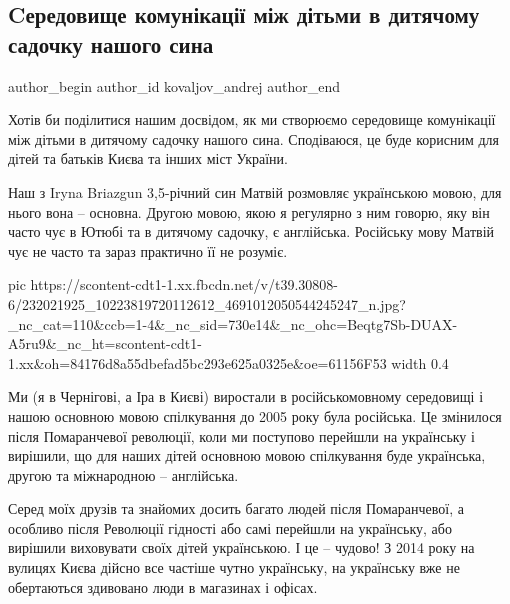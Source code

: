  
 
 
 
 
 
\subsection{Cередовище комунікації між дітьми в дитячому садочку нашого сина}
\label{sec:06_08_2021.fb.kovaljov_andrej.1.detsad_mova}
 
\ifcmt
 author_begin
   author_id kovaljov_andrej
 author_end
\fi

Хотів би поділитися нашим досвідом, як ми створюємо середовище комунікації між
дітьми в дитячому садочку нашого сина. Сподіваюся, це буде корисним для дітей
та батьків Києва та інших міст України.

Наш з Iryna Briazgun 3,5-річний син Матвій розмовляє українською мовою, для
нього вона – основна. Другою мовою, якою я регулярно з ним говорю, яку він
часто чує в Ютюбі та в дитячому садочку, є англійська. Російську мову Матвій
чує не часто та зараз практично її не розуміє.

\ifcmt
  pic https://scontent-cdt1-1.xx.fbcdn.net/v/t39.30808-6/232021925_10223819720112612_4691012050544245247_n.jpg?_nc_cat=110&ccb=1-4&_nc_sid=730e14&_nc_ohc=Beqtg7Sb-DUAX-A5ru9&_nc_ht=scontent-cdt1-1.xx&oh=84176d8a55dbefad5bc293e625a0325e&oe=61156F53
  width 0.4
\fi

Ми (я в Чернігові, а Іра в Києві) виростали в російськомовному середовищі і
нашою основною мовою спілкування до 2005 року була російська. Це змінилося
після Помаранчевої революції, коли ми поступово перейшли на українську і
вирішили, що для наших дітей основною мовою спілкування буде українська, другою
та міжнародною – англійська.

Серед моїх друзів та знайомих досить багато людей після Помаранчевої, а
особливо після Революції гідності або самі перейшли на українську, або вирішили
виховувати своїх дітей українською. І це – чудово! З 2014 року на вулицях Києва
дійсно все частіше чутно українську, на українську вже не обертаються здивовано
люди в магазинах і офісах. 

